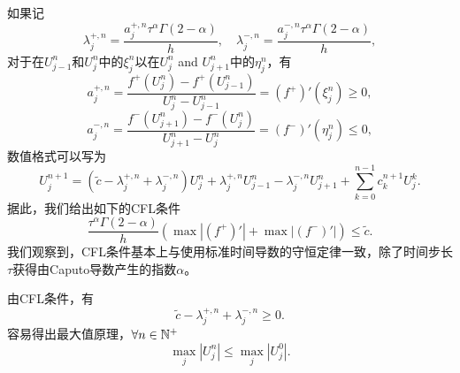 如果记
\[
\lambda^{+,n}_j = \frac{a^{+,n}_j  \tau^\alpha \Gamma (2-\alpha)}  {h}, \quad \lambda^{-,n}_j = \frac{a^{-,n}_j  \tau^\alpha \Gamma (2-\alpha)}  {h},
\]
对于在$U^n_{j-1}$和$U^n_{j}$中的$\xi^n_j$以在$U^n_j$ and $U^n_{j+1}$中的$\eta^n_j$，有
\[
a^{+,n}_j=\frac{f^+ (U_j^n)- f^+(U_{j-1}^n)}{U^n_j-U^n_{j-1}}=(f^+)' (\xi^n_j) \ge 0,
\]
\[
a^{-,n}_j=\frac{f^- (U_{j+1}^n)- f^-(U_{j}^n)}{U^n_{j+1}-U^n_{j}}=(f^-)' (\eta^n_j) \le 0,
\]
数值格式可以写为
\begin{equation}\label{reform}
U_j^{n+1}=(\tilde c-\lambda^{+,n}_j +\lambda^{-,n}_j )U_j^{n}+ \lambda^{+,n}_j  U_{j-1}^n -\lambda^{-,n}_j U^n_{j+1}+ \sum_{k=0}^{n-1} c^{n+1}_k U_j^k.
\end{equation}
据此，我们给出如下的CFL条件
\begin{equation}\label{CFL}
 \frac{ \tau^\alpha \Gamma (2-\alpha)}  {h} \left( \max |(f^+)'|+\max|(f^-)'| \right)  \le \tilde c.
\end{equation}
我们观察到，CFL条件基本上与使用标准时间导数的守恒定律一致，除了时间步长$\tau$获得由Caputo导数产生的指数$\alpha$。

由CFL条件，有
\[
\tilde c-\lambda^{+,n}_j +\lambda^{-,n}_j  \ge 0.
\]
容易得出最大值原理，$\forall n \in {\mathbb{N}}^+$
\[
\max_j |U^n_j| \le \max_j |U^0_j|. 
\]


